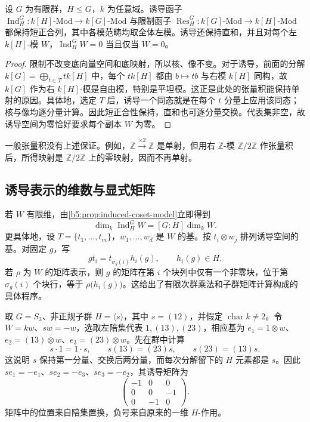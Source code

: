 \begin{corollary}\label{b5:cor:induction-exact}
	设 \(G\) 为有限群，\(H\le G\)，\(k\) 为任意域。诱导函子 \(\operatorname{Ind}_H^G:k[H]\text{-}\mathrm{Mod}\to k[G]\text{-}\mathrm{Mod}\) 与限制函子 \(\operatorname{Res}_H^G:k[G]\text{-}\mathrm{Mod}\to k[H]\text{-}\mathrm{Mod}\) 都保持短正合列，其中各模范畴均取全体左模。诱导还保持直和，并且对每个左 \(k[H]\)-模 \(W\)，\(\operatorname{Ind}_H^G W=0\) 当且仅当 \(W=0\)。
\end{corollary}
\begin{proof}
	限制不改变底向量空间和底映射，所以核、像不变。对于诱导，前面的分解 \(k[G]=\bigoplus_{t\in T}t k[H]\) 中，每个 \(t k[H]\) 都由 \(b\mapsto tb\) 与右模 \(k[H]\) 同构，故 \(k[G]\) 作为右 \(k[H]\)-模是自由模，特别是平坦模。这正是此处的张量积能保持单射的原因。具体地，选定 \(T\) 后，诱导一个同态就是在每个 \(t\) 分量上应用该同态；核与像均逐分量计算。因此短正合性保持，直和也可逐分量交换。代表集非空，故诱导空间为零恰好要求每个副本 \(W\) 为零。
\end{proof}

一般张量积没有上述保证。例如，\(\mathbb Z\xrightarrow{\times2}\mathbb Z\) 是单射，但用右 \(\mathbb Z\)-模 \(\mathbb Z/2\mathbb Z\) 作张量积后，所得映射是 \(\mathbb Z/2\mathbb Z\) 上的零映射，因而不再单射。

\subsection{诱导表示的维数与显式矩阵}
\label{b5:subsec:0301:03}

若 \(W\) 有限维，由\cref{b5:prop:induced-coset-model}立即得到
\begin{equation}\label{b5:eq:induction-dimension}
	\dim_k\operatorname{Ind}_H^G W=[G:H]\dim_k W.
\end{equation}
更具体地，设 \(T=\{t_1,\ldots,t_m\}\)，\(w_1,\ldots,w_d\) 是 \(W\) 的基。按 \(t_i\otimes w_j\) 排列诱导空间的基。对固定 \(g\)，写
\[
	gt_i=t_{\sigma_g(i)}h_i(g),\qquad h_i(g)\in H.
\]
若 \(\rho\) 为 \(W\) 的矩阵表示，则 \(g\) 的矩阵在第 \(i\) 个块列中仅有一个非零块，位于第 \(\sigma_g(i)\) 个块行，等于 \(\rho\bigl(h_i(g)\bigr)\)。这给出了有限次群乘法和子群矩阵计算构成的具体程序。

\ProseParagraphBreak
取 \(G=S_3\)、非正规子群 \(H=\langle s\rangle\)，其中 \(s=(12)\)，并假定 \(\operatorname{char}k\ne2\)。令 \(W=kw\)、\(sw=-w\)，选取左陪集代表 \(1,(13),(23)\)，相应基为 \(e_1=1\otimes w\)、\(e_2=(13)\otimes w\)、\(e_3=(23)\otimes w\)。先在群中计算
\[
	s\cdot1=1\cdot s,\qquad s(13)=(23)s,\qquad s(23)=(13)s.
\]
这说明 \(s\) 保持第一分量、交换后两分量，而每次分解留下的 \(H\) 元素都是 \(s\)。因此 \(s e_1=-e_1\)、\(s e_2=-e_3\)、\(s e_3=-e_2\)，其诱导矩阵为
\[
	\begin{pmatrix}
		-1&0&0\\
		0&0&-1\\
		0&-1&0
	\end{pmatrix}.
\]
矩阵中的位置来自陪集置换，负号来自原来的一维 \(H\)-作用。

